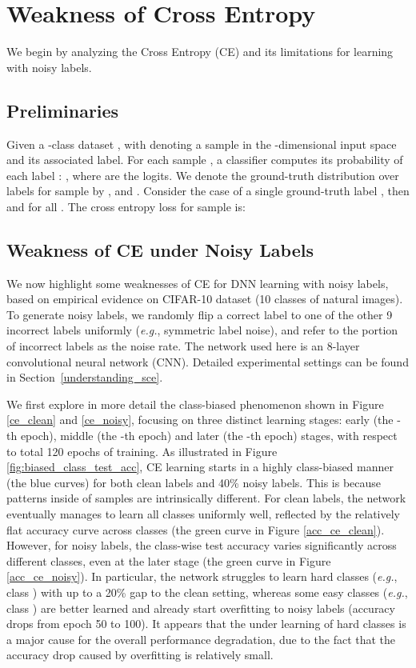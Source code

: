 \documentclass[10pt,twocolumn,letterpaper]{article}
\begin{document}
\section{Weakness of Cross Entropy}\label{sec:understanding}
We begin by analyzing the Cross Entropy (CE) and its limitations for learning with noisy labels.

\subsection{Preliminaries}
Given a -class dataset , with  denoting a sample in the -dimensional input space and  its associated label. For each sample , a classifier  computes its probability of each label : , where  are the logits. We denote the ground-truth distribution over labels for sample  by , and . Consider the case of a single ground-truth label , then  and  for all . The cross entropy loss for sample  is:
\vspace{-0.1 in}


\subsection{Weakness of CE under Noisy Labels}\label{drawback_ce}
We now highlight some weaknesses of CE for DNN learning with noisy labels, based on empirical evidence on CIFAR-10 dataset \cite{krizhevsky2009learning} (10 classes of natural images). To generate noisy labels, we randomly flip a correct label to one of the other 9 incorrect labels uniformly (\textit{e.g.}, symmetric label noise), and refer to the portion of incorrect labels as the noise rate. The network used here is an 8-layer convolutional neural network (CNN). Detailed experimental settings can be found in Section~\ref{understanding_sce}.

We first explore in more detail the class-biased phenomenon shown in Figure \ref{ce_clean} and \ref{ce_noisy}, focusing on three distinct learning stages: early (the -th epoch), middle (the -th epoch) and later (the -th epoch) stages, with respect to total 120 epochs of training. 
As illustrated in Figure \ref{fig:biased_class_test_acc}, CE learning starts in a highly class-biased manner (the blue curves) for both clean labels and 40\% noisy labels. 
This is because patterns inside of samples are intrinsically different. For clean labels, the network eventually manages to learn all classes uniformly well, reflected by the relatively flat accuracy curve across classes (the green curve in Figure \ref{acc_ce_clean}). However, for noisy labels, the class-wise test accuracy varies significantly across different classes, even at the later stage (the green curve in Figure \ref{acc_ce_noisy}). In particular, the network struggles to learn hard classes (\textit{e.g.}, class ) with up to a 20\% gap to the clean setting, whereas some easy classes (\textit{e.g.}, class ) are better learned and already start overfitting to noisy labels (accuracy drops from epoch 50 to 100). It appears that the under learning of hard classes is a major cause for the overall performance degradation, due to the fact that the accuracy drop caused by overfitting is relatively small.  
\end{document}
